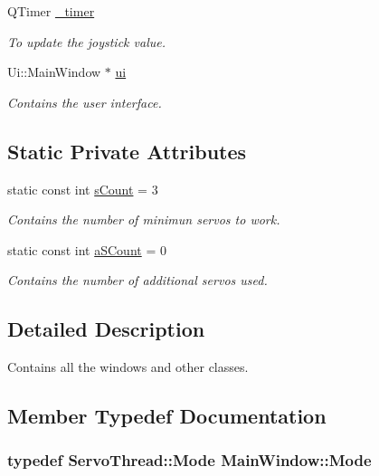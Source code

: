 \begin{DoxyCompactItemize}
Q\+Timer \hyperlink{a00005_a254b03b878cfda75c1c411a2f8568d33}{\+\_\+timer}
\begin{DoxyCompactList}\small\item\em To update the joystick value. \end{DoxyCompactList}\item 
Ui\+::\+Main\+Window $\ast$ \hyperlink{a00005_a35466a70ed47252a0191168126a352a5}{ui}
\begin{DoxyCompactList}\small\item\em Contains the user interface. \end{DoxyCompactList}\end{DoxyCompactItemize}
\subsection*{Static Private Attributes}
\begin{DoxyCompactItemize}
\item 
static const int \hyperlink{a00005_a646727b1c45c72638325adfd460649c0}{s\+Count} = 3
\begin{DoxyCompactList}\small\item\em Contains the number of minimun servos to work. \end{DoxyCompactList}\item 
static const int \hyperlink{a00005_a42c44af9c0eebc33f4e81f02e15b0461}{a\+S\+Count} = 0
\begin{DoxyCompactList}\small\item\em Contains the number of additional servos used. \end{DoxyCompactList}\end{DoxyCompactItemize}


\subsection{Detailed Description}
Contains all the windows and other classes. 

\subsection{Member Typedef Documentation}
\hypertarget{a00005_a372482d77430e41c5483ab8605eece9d}{}
\subsubsection[{Mode}]{\setlength{\rightskip}{0pt plus 5cm}typedef {\bf Servo\+Thread\+::\+Mode} {\bf Main\+Window\+::\+Mode}\hspace{0.3cm}{\ttfamily [private]}}\label{a00005_a372482d77430e41c5483ab8605eece9d}


